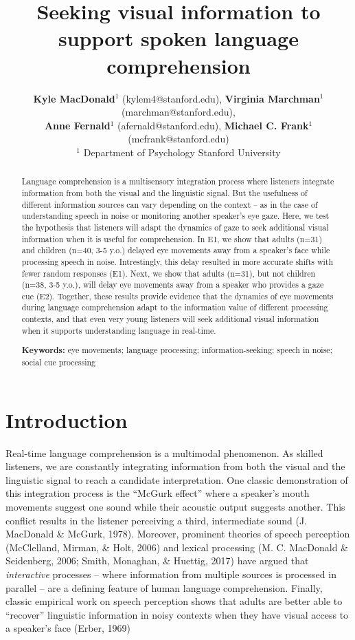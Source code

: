 \documentclass[10pt, letterpaper]{article}
\title{Seeking visual information to support spoken language comprehension}
\author{ {\large \bf Kyle MacDonald}$^1$ (kylem4@stanford.edu), {\large \bf Virginia Marchman}$^1$ (marchman@stanford.edu),  \\ {\large \bf Anne Fernald}$^1$ (afernald@stanford.edu), {\large \bf Michael C. Frank}$^1$ (mcfrank@stanford.edu) 
  \\ $^1$ Department of Psychology Stanford University}
\begin{document}
\maketitle

\begin{abstract}
Language comprehension is a multisensory integration process where
listeners integrate information from both the visual and the linguistic
signal. But the usefulness of different information sources can vary
depending on the context -- as in the case of understanding speech in
noise or monitoring another speaker's eye gaze. Here, we test the
hypothesis that listeners will adapt the dynamics of gaze to seek
additional visual information when it is useful for comprehension. In
E1, we show that adults (n=31) and children (n=40, 3-5 y.o.) delayed eye
movements away from a speaker's face while processing speech in noise.
Intrestingly, this delay resulted in more accurate shifts with fewer
random responses (E1). Next, we show that adults (n=31), but not
children (n=38, 3-5 y.o.), will delay eye movements away from a speaker
who provides a gaze cue (E2). Together, these results provide evidence
that the dynamics of eye movements during language comprehension adapt
to the information value of different processing contexts, and that even
very young listeners will seek additional visual information when it
supports understanding language in real-time.

\textbf{Keywords:}
eye movements; language processing; information-seeking; speech in
noise; social cue processing
\end{abstract}

\section{Introduction}\label{introduction}

Real-time language comprehension is a multimodal phenomenon. As skilled
listeners, we are constantly integrating information from both the
visual and the linguistic signal to reach a candidate interpretation.
One classic demonstration of this integration process is the ``McGurk
effect'' where a speaker's mouth movements suggest one sound while their
acoustic output suggests another. This conflict results in the listener
perceiving a third, intermediate sound (J. MacDonald \& McGurk, 1978).
Moreover, prominent theories of speech perception (McClelland, Mirman,
\& Holt, 2006) and lexical processing (M. C. MacDonald \& Seidenberg,
2006; Smith, Monaghan, \& Huettig, 2017) have argued that
\emph{interactive} processes -- where information from multiple sources
is processed in parallel -- are a defining feature of human language
comprehension. Finally, classic empirical work on speech perception
shows that adults are better able to ``recover'' linguistic information
in noisy contexts when they have visual access to a speaker's face
(Erber, 1969)
\end{document}
